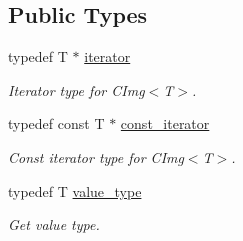 \subsection*{Public Types}
\begin{DoxyCompactItemize}
\item 
typedef T $\ast$ \hyperlink{structcimg__library_1_1_c_img_a3ff3f07802e67c4ba930427ea45655c8}{iterator}
\begin{DoxyCompactList}\small\item\em Iterator type for CImg$<$T$>$. \item\end{DoxyCompactList}\item 
typedef const T $\ast$ \hyperlink{structcimg__library_1_1_c_img_ad444f21017aaa7da6fab45930d3579aa}{const\_\-iterator}
\begin{DoxyCompactList}\small\item\em Const iterator type for CImg$<$T$>$. \item\end{DoxyCompactList}\item 
\hypertarget{structcimg__library_1_1_c_img_a94119922993ffa72217a158fede82f3b}{
typedef T \hyperlink{structcimg__library_1_1_c_img_a94119922993ffa72217a158fede82f3b}{value\_\-type}}
\label{structcimg__library_1_1_c_img_a94119922993ffa72217a158fede82f3b}

\begin{DoxyCompactList}\small\item\em Get value type. \item\end{DoxyCompactList}\end{DoxyCompactItemize}
